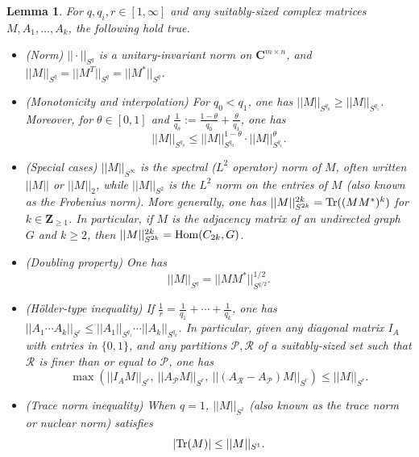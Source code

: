 \documentclass[reqno,11pt]{amsart}
\newtheorem{lemma}[theorem]{Lemma}
\theoremstyle{definition}
\theoremstyle{remark}
\numberwithin{equation}{section}
\newcommand{\Z}{\mathbf{Z}}
\newcommand{\C}{\mathbf{C}}
\newcommand{\mR}{\mathcal{R}}
\newcommand{\mP}{\mathcal{P}}
\newcommand{\Tr}{\textnormal{Tr}}
\newcommand{\Hom}{\textnormal{Hom}}
\begin{document}
\begin{lemma} \label{lem:Schatten-norms-matrices}
For $q, q_i, r \in [1, \infty]$ and any suitably-sized complex matrices $M, A_1, \ldots, A_k$, the following hold true.
\begin{itemize}
    \item[$(i)$.] \emph{(Norm)} $||\cdot||_{S^q}$ is a unitary-invariant norm on $\C^{m \times n}$, and $||M||_{S^q} = ||M^T||_{S^q} = ||M^*||_{S^q}$.
    \item[$(ii)$.] \emph{(Monotonicity and interpolation)} For $q_0 < q_1$, one has $||M||_{S^{q_0}} \ge ||M||_{S^{q_1}}$. Moreover, for $\theta \in [0, 1]$ and $\frac{1}{q_\theta} := \frac{1-\theta}{q_0} + \frac{\theta}{q_1}$, one has 
    \[
        ||M||_{S^{q_\theta}} \le ||M||_{S^{q_0}}^{1-\theta} \cdot  ||M||_{S^{q_1}}^{\theta}.
    \]
    \item[$(iii)$.] \emph{(Special cases)} $||M||_{S^\infty}$ is the spectral ($L^2$ operator) norm of $M$, often written $||M||$ or $||M||_2$, while $||M||_{S^2}$ is the $L^2$ norm on the entries of $M$ (also known as the Frobenius norm). More generally, one has $||M||_{S^{2k}}^{2k} = \Tr((MM^*)^k)$ for $k \in \Z_{\ge 1}$. In particular, if $M$ is the adjacency matrix of an undirected graph $G$ and $k \ge 2$, then $||M||_{S^{2k}}^{2k} = \Hom(C_{2k}, G)$.
    \item[$(iv)$.] \emph{(Doubling property)} One has
    \begin{equation} \label{eq:halfing}
        ||M||_{S^q} = ||MM^*||_{S^{q/2}}^{1/2}.
    \end{equation}
    \item[$(v)$.] \emph{(H\"older-type inequality)} If $\frac{1}{r} = \frac{1}{q_1} + \cdots + \frac{1}{q_k}$, one has $||A_1 \cdots A_k||_{S^r} \le ||A_1||_{S^{q_1}} \cdots ||A_k||_{S^{q_k}}$. In particular, given any diagonal matrix $I_A$ with entries in $\{0, 1\}$, and any partitions $\mP, \mR$ of a suitably-sized set such that $\mR$ is finer than or equal to $\mP$, one has
    \begin{equation} \label{eq:ignore-averaging}
        \max\left(||I_A M||_{S^r},\ ||A_{\mP}M||_{S^r},\ ||(A_{\mR} - A_\mP)M||_{S^r} \right) \le ||M||_{S^r}.
    \end{equation}
    \item[$(vi)$.] \emph{(Trace norm inequality)} When $q = 1$, $||M||_{S^1}$ (also known as the trace norm or nuclear norm) satisfies
    \[
        |\Tr(M)| \le ||M||_{S^1}.
    \]
\end{itemize}

\end{lemma}
\end{document}
